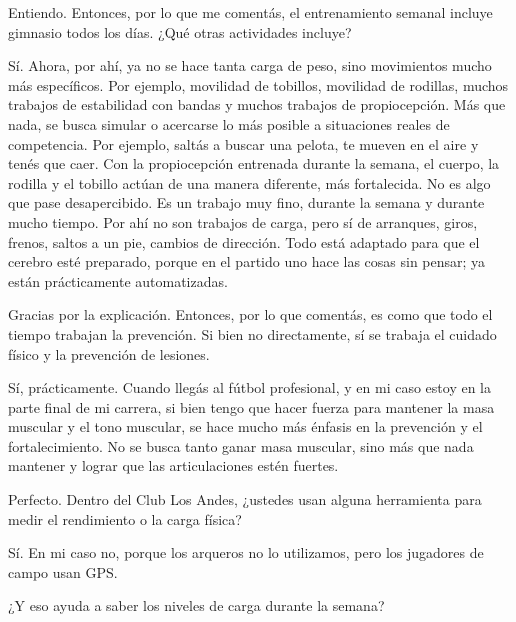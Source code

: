 \begin{description}[leftmargin=0pt, itemindent=\parindent, labelsep=0.5em, itemsep=0pt, parsep=0pt, topsep=0pt]
    \item[\textbf{Entrevistador:}] Entiendo. Entonces, por lo que me comentás, el entrenamiento semanal incluye gimnasio todos los días. ¿Qué otras actividades incluye?

    \item[\textbf{Sebastián López:}] Sí. Ahora, por ahí, ya no se hace tanta carga de peso, sino movimientos mucho más específicos. Por ejemplo, movilidad de tobillos, movilidad de rodillas, muchos trabajos de estabilidad con bandas y muchos trabajos de propiocepción. Más que nada, se busca simular o acercarse lo más posible a situaciones reales de competencia. Por ejemplo, saltás a buscar una pelota, te mueven en el aire y tenés que caer. Con la propiocepción entrenada durante la semana, el cuerpo, la rodilla y el tobillo actúan de una manera diferente, más fortalecida. No es algo que pase desapercibido. Es un trabajo muy fino, durante la semana y durante mucho tiempo. Por ahí no son trabajos de carga, pero sí de arranques, giros, frenos, saltos a un pie, cambios de dirección. Todo está adaptado para que el cerebro esté preparado, porque en el partido uno hace las cosas sin pensar; ya están prácticamente automatizadas.

    \item[\textbf{Entrevistador:}] Gracias por la explicación. Entonces, por lo que comentás, es como que todo el tiempo trabajan la prevención. Si bien no directamente, sí se trabaja el cuidado físico y la prevención de lesiones.

    \item[\textbf{Sebastián López:}] Sí, prácticamente. Cuando llegás al fútbol profesional, y en mi caso estoy en la parte final de mi carrera, si bien tengo que hacer fuerza para mantener la masa muscular y el tono muscular, se hace mucho más énfasis en la prevención y el fortalecimiento. No se busca tanto ganar masa muscular, sino más que nada mantener y lograr que las articulaciones estén fuertes.

    \item[\textbf{Entrevistador:}] Perfecto. Dentro del Club Los Andes, ¿ustedes usan alguna herramienta para medir el rendimiento o la carga física?

    \item[\textbf{Sebastián López:}] Sí. En mi caso no, porque los arqueros no lo utilizamos, pero los jugadores de campo usan GPS.

    \item[\textbf{Entrevistador:}] ¿Y eso ayuda a saber los niveles de carga durante la semana?


\end{description}
